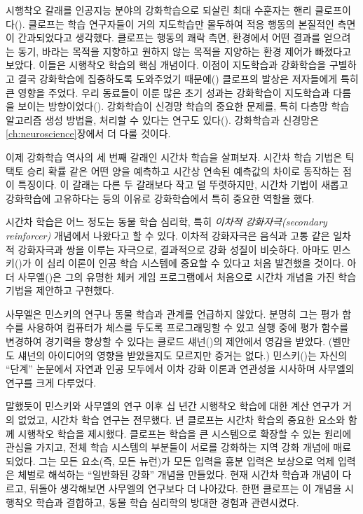시행착오 갈래를 인공지능 분야의 강화학습으로 되살린 최대 수훈자는 핸리
클로프이다(\cite{Klopf1972, Klopf1975, Klopf1982}). 클로프는 학습 연구자들이
거의 지도학습만 몰두하여 적응 행동의 본질적인 측면이 간과되었다고 생각했다.
클로프는 행동의 쾌락 측면, 환경에서 어떤 결과를 얻으려는 동기, 바라는 목적을
지향하고 원하지 않는 목적을 지양하는 환경 제어가 빠졌다고 보았다. 이들은
시행착오 학습의 핵심 개념이다. 이점이 지도학습과 강화학습을 구별하고 결국
강화학습에 집중하도록 도와주었기 때문에(\cite{BartoSutton1981a}) 클로프의 발상은
저자들에게 특히 큰 영향을 주었다. 우리 동료들이 이룬 많은 초기 성과는 강화학습이
지도학습과 다름을 보이는 방향이었다(\cite{BartoSuttonBrouwer1981,
BartoSutton1981b, BartoAnandan1985}). 강화학습이 신경망 학습의 중요한 문제를,
특히 다층망 학습 알고리즘 생성 방법을, 처리할 수 있다는 연구도
있다(\cite{BartoAndersonSutton1982, BartoAnderson1985, BartoAnandan1985,
Barto1985, Barto1986, BartoJordan1987}). 강화학습과 신경망은
\ref{ch:neuroscience}장에서 더 다룰 것이다.


이제 강화학습 역사의 세 번째 갈래인 시간차 학습을 살펴보자. 시간차 학습 기법은
틱택토 승리 확률 같은 어떤 양을 예측하고 시간상 연속된 예측값의 차이로 동작하는
점이 특징이다. 이 갈래는 다른 두 갈래보다 작고 덜 뚜렷하지만, 시간차 기법이
새롭고 강화학습에 고유하다는 등의 이유로 강화학습에서 특히 중요한 역할을 했다.

시간차 학습은 어느 정도는 동물 학습 심리학, 특히 \emph{이차적 강화자극(secondary
reinforcer)} 개념에서 나왔다고 할 수 있다. 이차적 강화자극은 음식과 고통 같은
일차적 강화자극과 쌍을 이루는 자극으로, 결과적으로 강화 성질이 비슷하다. 아마도
민스키(\cite*{Minsky1954})가 이 심리 이론이 인공 학습 시스템에 중요할 수 있다고
처음 발견했을 것이다. 아더 사무엘(\cite{Samuel1959})은 그의 유명한 체커 게임
프로그램에서 처음으로 시간차 개념을 가진 학습 기법을 제안하고 구현했다.

사무엘은 민스키의 연구나 동물 학습과 관계를 언급하지 않았다. 분명히 그는 평가
함수를 사용하여 컴퓨터가 체스를 두도록 프로그래밍할 수 있고 실행 중에 평가
함수를 변경하여 경기력을 향상할 수 있다는 클로드 섀넌(\cite*{Shannon1950})의
제안에서 영감을 받았다. (벨만도 섀넌의 아이디어의 영향을 받았을지도 모르지만
증거는 없다.) 민스키(\cite*{Minsky1961})는 자신의 ``단계'' 논문에서 자연과 인공
모두에서 이차 강화 이론과 연관성을 시사하며 사무엘의 연구를 크게 다루었다.

말했듯이 민스키와 사무엘의 연구 이후 십 년간 시행착오 학습에 대한 계산 연구가
거의 없었고, 시간차 학습 연구는 전무했다. \cite*{Klopf1972}년 클로프는 시간차
학습의 중요한 요소와 함께 시행착오 학습을 제시했다. 클로프는 학습을 큰
시스템으로 확장할 수 있는 원리에 관심을 가지고, 전체 학습 시스템의 부분들이
서로를 강화하는 지역 강화 개념에 매료되었다. 그는 모든 요소(즉, 모든 뉴런)가
모든 입력을 흥분 입력은 보상으로 억제 입력은 체벌로 해석하는 ``일반화된 강화''
개념을 만들었다. 현재 시간차 학습과 개념이 다르고, 뒤돌아 생각해보면 사무엘의
연구보다 더 나아갔다. 한편 클로프는 이 개념을 시행착오 학습과 결합하고, 동물
학습 심리학의 방대한 경험과 관련시켰다.

